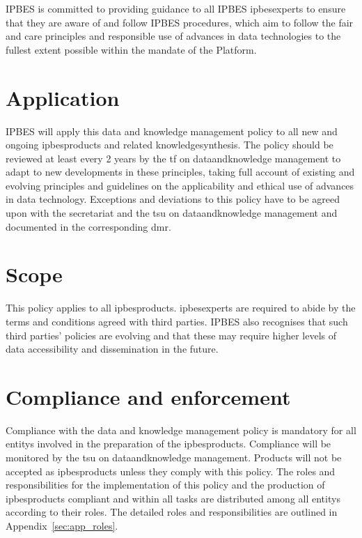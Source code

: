\documentclass{article}
\begin{document}
IPBES is committed to providing guidance to all IPBES \glspl{ipbesexpert} to ensure that they are aware of and follow IPBES procedures, which aim to follow the \gls{fair} and \gls{care} principles and responsible use of advances in \gls{data} technologies to the fullest extent possible within the mandate of the Platform.

\section{Application}

IPBES will apply this \gls{data} and \gls{knowledge} management policy to all new and ongoing \glspl{ipbesproduct} and related \gls{knowledgesynthesis}. The policy should be reviewed at least every 2 years by the \gls{tf} on \gls{dataandknowledge} management to adapt to new developments in these principles, taking full account of existing and evolving principles and guidelines on the applicability and ethical use of advances in \gls{data} technology. Exceptions and deviations to this policy have to be agreed upon with the \gls{secretariat} and the \gls{tsu} on \gls{dataandknowledge} management and documented in the corresponding \gls{dmr}.

\section{Scope}

This policy applies to all \glspl{ipbesproduct}. \glspl{ipbesexpert} are required to abide by the terms and conditions agreed with third parties. IPBES also recognises that such third parties’ policies are evolving and that these may require higher levels of \gls{data} accessibility and dissemination in the future.

\section{Compliance and enforcement}

Compliance with the data and knowledge management policy is mandatory for all \glspl{entity} involved in the preparation of the \glspl{ipbesproduct}. Compliance will be monitored by the \gls{tsu} on \gls{dataandknowledge} management. Products will not be accepted as \glspl{ipbesproduct} unless they comply with this policy. 
The roles and responsibilities for the implementation of this policy and the production of \glspl{ipbesproduct} compliant and within all \glspl{task} are distributed among all \glspl{entity} according to their roles. The detailed roles and responsibilities are outlined in Appendix~\ref{sec:app_roles}.
\end{document}
